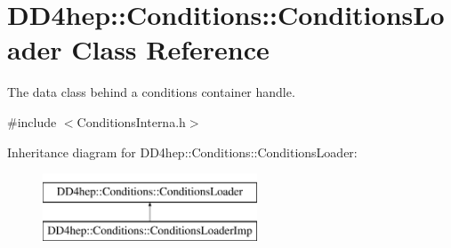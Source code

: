 \hypertarget{class_d_d4hep_1_1_conditions_1_1_conditions_loader}{}\section{D\+D4hep\+:\+:Conditions\+:\+:Conditions\+Loader Class Reference}
\label{class_d_d4hep_1_1_conditions_1_1_conditions_loader}


The data class behind a conditions container handle.  




{\ttfamily \#include $<$Conditions\+Interna.\+h$>$}

Inheritance diagram for D\+D4hep\+:\+:Conditions\+:\+:Conditions\+Loader\+:\begin{figure}[H]
\begin{center}
\leavevmode
\includegraphics[height=2.000000cm]{class_d_d4hep_1_1_conditions_1_1_conditions_loader}
\end{center}
\end{figure}
